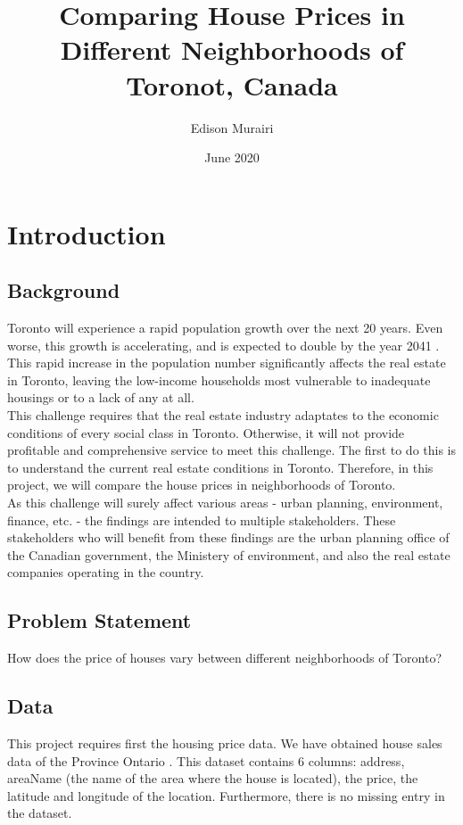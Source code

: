 \documentclass{article}
\title{Comparing House Prices in Different Neighborhoods of Toronot, Canada}
\author{Edison Murairi }
\date{June 2020}
\begin{document}
\maketitle

\section{Introduction}
\subsection{Background}
Toronto will experience a rapid population growth over the next 20 years. Even worse, this growth is accelerating, and is expected to double by the year 2041 \cite{toronto}. This rapid increase in the population number significantly affects the real estate in Toronto, leaving the low-income households most vulnerable to inadequate housings or to a lack of any at all. \\

This challenge requires that the real estate industry adaptates  to the economic conditions of every social class in Toronto. Otherwise, it will not provide profitable and comprehensive service to meet this challenge. The first to do this is to understand the current real estate conditions in Toronto. Therefore, in this project, we will compare the house prices in neighborhoods of Toronto. \\

As this challenge will surely affect various areas - urban planning, environment, finance, etc. - the findings are intended to multiple stakeholders. These stakeholders who will benefit from these findings are the urban planning office of the Canadian government, the Ministery of environment, and also the real estate companies operating in the country.

\subsection{Problem Statement}
How does the price of houses vary between different neighborhoods of Toronto?

\subsection{Data}
This project requires first the housing price data. We have obtained house sales data of the Province Ontario \cite{houses_sale}. This dataset contains 6 columns: address, areaName (the name of the area where the house is located), the price, the latitude and longitude of the location. Furthermore, there is no missing entry in the dataset.\\
\end{document}
